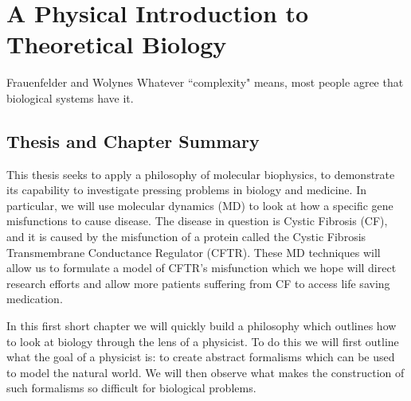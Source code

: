 \chapter{A Physical Introduction to Theoretical Biology}
\setcounter{page}{1}
\label{chap:introduction}

\begin{chapquote}  {Frauenfelder and Wolynes \cite{frauenfelder1994}}
Whatever ``complexity" means, most people agree that biological systems have it.
\end{chapquote}

\section{Thesis and Chapter Summary}

This thesis seeks to apply a philosophy of molecular biophysics, to demonstrate its capability to investigate pressing problems in biology and medicine. In particular, we will use molecular dynamics (MD) to look at how a specific gene misfunctions to cause disease. The disease in question is Cystic Fibrosis (CF), and it is caused by the misfunction of a protein called the Cystic Fibrosis Transmembrane Conductance Regulator (CFTR). These MD techniques will allow us to formulate a model of CFTR's misfunction which we hope will direct research efforts and allow more patients suffering from CF to access life saving medication. 

In this first short chapter we will quickly build a philosophy which outlines how to look at biology through the lens of a physicist. To do this we will first outline what the goal of a physicist is: to create abstract formalisms which can be used to model the natural world. We will then observe what makes the construction of such formalisms so difficult for biological problems. 

